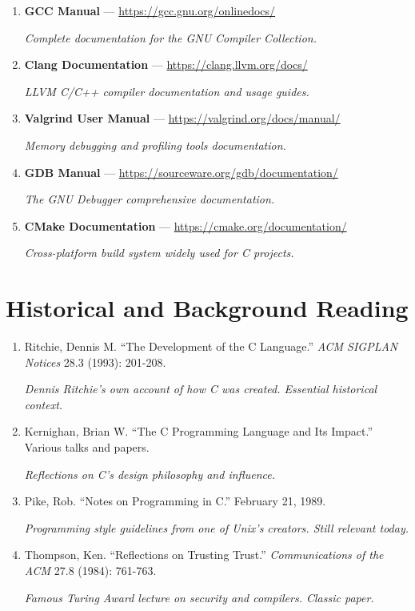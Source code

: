 \documentclass[10pt,openany]{book}
\begin{document}
\begin{enumerate}
    \item \textbf{GCC Manual} — \url{https://gcc.gnu.org/onlinedocs/}

    \textit{Complete documentation for the GNU Compiler Collection.}

    \item \textbf{Clang Documentation} — \url{https://clang.llvm.org/docs/}

    \textit{LLVM C/C++ compiler documentation and usage guides.}

    \item \textbf{Valgrind User Manual} — \url{https://valgrind.org/docs/manual/}

    \textit{Memory debugging and profiling tools documentation.}

    \item \textbf{GDB Manual} — \url{https://sourceware.org/gdb/documentation/}

    \textit{The GNU Debugger comprehensive documentation.}

    \item \textbf{CMake Documentation} — \url{https://cmake.org/documentation/}

    \textit{Cross-platform build system widely used for C projects.}
\end{enumerate}

\section*{Historical and Background Reading}

\begin{enumerate}
    \item Ritchie, Dennis M. ``The Development of the C Language.'' \textit{ACM SIGPLAN Notices} 28.3 (1993): 201-208.

    \textit{Dennis Ritchie's own account of how C was created. Essential historical context.}

    \item Kernighan, Brian W. ``The C Programming Language and Its Impact.'' Various talks and papers.

    \textit{Reflections on C's design philosophy and influence.}

    \item Pike, Rob. ``Notes on Programming in C.'' February 21, 1989.

    \textit{Programming style guidelines from one of Unix's creators. Still relevant today.}

    \item Thompson, Ken. ``Reflections on Trusting Trust.'' \textit{Communications of the ACM} 27.8 (1984): 761-763.

    \textit{Famous Turing Award lecture on security and compilers. Classic paper.}
\end{enumerate}
\end{document}
